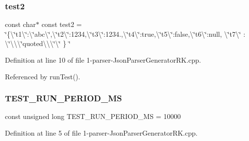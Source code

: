 \subsubsection{\texorpdfstring{test2}{test2}}
{\footnotesize\ttfamily const char$\ast$ const test2 = \char`\"{}\{\textbackslash{}\char`\"{}t1\textbackslash{}\char`\"{}\+:\textbackslash{}\char`\"{}abc\textbackslash{}\char`\"{},\textbackslash{}\char`\"{}t2\textbackslash{}\char`\"{}\+:1234,\textbackslash{}\char`\"{}t3\textbackslash{}\char`\"{}\+:1234.,\textbackslash{}\char`\"{}t4\textbackslash{}\char`\"{}\+:true,\textbackslash{}\char`\"{}t5\textbackslash{}\char`\"{}\+:false,\textbackslash{}\char`\"{}t6\textbackslash{}\char`\"{}\+:null, \textbackslash{}\char`\"{}t7\textbackslash{}\char`\"{} \+: \textbackslash{}\char`\"{}\textbackslash{}\textbackslash{}\textbackslash{}\char`\"{}quoted\textbackslash{}\textbackslash{}\textbackslash{}\char`\"{}\textbackslash{}\char`\"{} \} \char`\"{}}



Definition at line 10 of file 1-\/parser-\/\+Json\+Parser\+Generator\+R\+K.\+cpp.



Referenced by run\+Test().

\mbox{\label{1-parser-_json_parser_generator_r_k_8cpp_a0aa12824a9c1a44e8d9f2499e0ba2698}} 
\subsubsection{\texorpdfstring{T\+E\+S\+T\+\_\+\+R\+U\+N\+\_\+\+P\+E\+R\+I\+O\+D\+\_\+\+MS}{TEST\_RUN\_PERIOD\_MS}}
{\footnotesize\ttfamily const unsigned long T\+E\+S\+T\+\_\+\+R\+U\+N\+\_\+\+P\+E\+R\+I\+O\+D\+\_\+\+MS = 10000}



Definition at line 5 of file 1-\/parser-\/\+Json\+Parser\+Generator\+R\+K.\+cpp.

